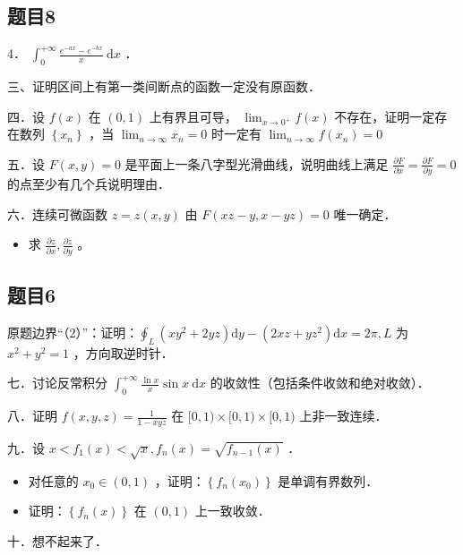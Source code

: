 \documentclass{article}
\begin{document}
\subsection{题目8}
4． \(\int_{0}^{+\infty} \frac{e^{-a x}-e^{-b x}}{x} \mathrm{~d} x\) ．

三、证明区间上有第一类间断点的函数一定没有原函数．

四．设 \(f(x)\) 在 \((0,1)\) 上有界且可导， \(\lim _{x \rightarrow 0^{+}} f(x)\) 不存在，证明一定存在数列 \(\left\{x_{n}\right\}\) ，当 \(\lim _{n \rightarrow \infty} x_{n}=0\) 时一定有 \(\lim _{n \rightarrow \infty} f\left(x_{n}\right)=0\)

五．设 \(F(x, y)=0\) 是平面上一条八字型光滑曲线，说明曲线上满足 \(\frac{\partial F}{\partial x}=\frac{\partial F}{\partial y}=0\) 的点至少有几个兵说明理由．

六．连续可微函数 \(z=z(x, y)\) 由 \(F(x z-y, x-y z)=0\) 唯一确定．

\begin{itemize}
  \item[（1）] 求 \(\frac{\partial z}{\partial x}, \frac{\partial z}{\partial y}\) 。
\end{itemize}

\subsection{题目6}
原题边界“（2）”：证明：\(\oint_{L}\left(x y^{2}+2 y z\right) \mathrm{d} y-\left(2 x z+y z^{2}\right) \mathrm{d} x=2 \pi, L\) 为 \(x^{2}+y^{2}=1\) ，方向取逆时针．

七．讨论反常积分 \(\int_{0}^{+\infty} \frac{\ln x}{x} \sin x \mathrm{~d} x\) 的收敛性（包括条件收敛和绝对收敛）．

八．证明 \(f(x, y, z)=\frac{1}{1-x y z}\) 在 \([0,1) \times[0,1) \times[0,1)\) 上非一致连续．

九．设 \(x<f_{1}(x)<\sqrt{x}, f_{n}(x)=\sqrt{f_{n-1}(x)}\) ．

\begin{itemize}
  \item[（1）] 对任意的 \(x_{0} \in(0,1)\) ，证明：\(\left\{f_{n}\left(x_{0}\right)\right\}\) 是单调有界数列．
  \item[（2）] 证明：\(\left\{f_{n}(x)\right\}\) 在 \((0,1)\) 上一致收敛．
\end{itemize}

十．想不起来了．
\end{document}
